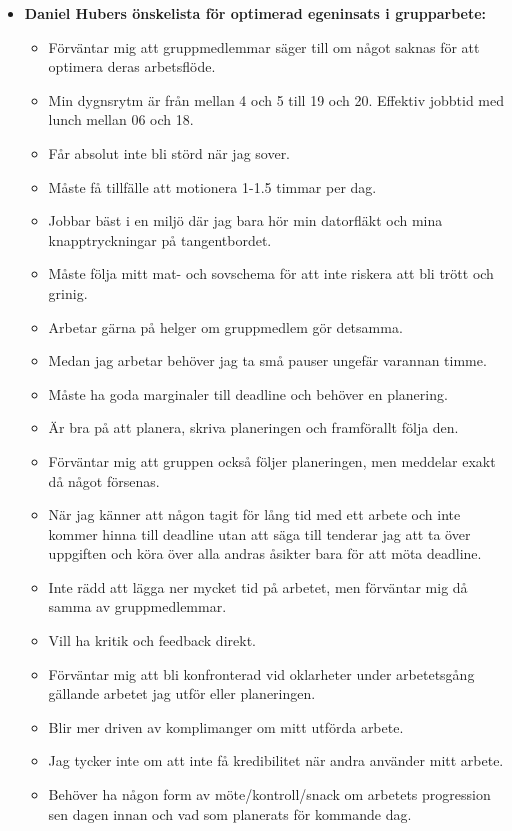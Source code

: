 \documentclass{mall}
\begin{document}
\begin{itemize}
\item \textbf{Daniel Hubers önskelista för optimerad egeninsats i grupparbete:}

  \begin{itemize}
  \item Förväntar mig att gruppmedlemmar säger till om något saknas för att optimera deras arbetsflöde.
  \item Min dygnsrytm är från mellan 4 och 5 till 19 och 20. Effektiv jobbtid med lunch mellan 06 och 18.
  \item Får absolut inte bli störd när jag sover.
  \item Måste få tillfälle att motionera 1-1.5 timmar per dag.
  \item Jobbar bäst i en miljö där jag bara hör min datorfläkt och mina knapptryckningar på tangentbordet.
  \item Måste följa mitt mat- och sovschema för att inte riskera att bli trött och grinig.
  \item Arbetar gärna på helger om gruppmedlem gör detsamma.
  \item Medan jag arbetar behöver jag ta små pauser ungefär varannan timme.
  \item Måste ha goda marginaler till deadline och behöver en planering.
  \item Är bra på att planera, skriva planeringen och framförallt följa den.
  \item Förväntar mig att gruppen också följer planeringen, men meddelar exakt då något försenas.
  \item När jag känner att någon tagit för lång tid med ett arbete och inte kommer hinna till deadline utan att säga till tenderar jag att ta över uppgiften och köra över alla andras åsikter bara för att möta deadline.
  \item Inte rädd att lägga ner mycket tid på arbetet, men förväntar mig då samma av gruppmedlemmar.
  \item Vill ha kritik och feedback direkt.
  \item Förväntar mig att bli konfronterad vid oklarheter under arbetetsgång gällande arbetet jag utför eller planeringen.
  \item Blir mer driven av komplimanger om mitt utförda arbete.
  \item Jag tycker inte om att inte få kredibilitet när andra använder mitt arbete.
  \item Behöver ha någon form av möte/kontroll/snack om arbetets progression sen dagen innan och vad som planerats för kommande dag. 

\end{itemize}
\end{itemize}
\end{document}
